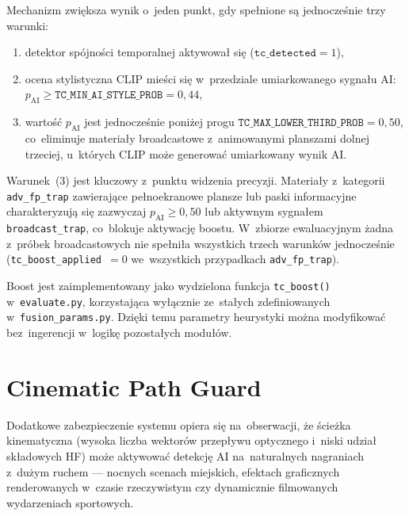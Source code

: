Mechanizm zwiększa wynik o~jeden punkt, gdy spełnione są jednocześnie
trzy warunki:
\begin{enumerate}
  \item detektor spójności temporalnej aktywował się ($\texttt{tc\_detected} = 1$),
  \item ocena stylistyczna CLIP mieści się w~przedziale umiarkowanego
    sygnału AI: $p_\text{AI} \geq \texttt{TC\_MIN\_AI\_STYLE\_PROB} = 0{,}44$,
  \item wartość $p_\text{AI}$ jest jednocześnie poniżej progu
    $\texttt{TC\_MAX\_LOWER\_THIRD\_PROB} = 0{,}50$,
    co~eliminuje materiały broadcastowe z~animowanymi planszami dolnej trzeciej,
    u~których CLIP może generować umiarkowany wynik AI.
\end{enumerate}

Warunek~(3) jest kluczowy z~punktu widzenia precyzji. Materiały z~kategorii
\texttt{adv\_fp\_trap} zawierające pełnoekranowe plansze lub paski informacyjne
charakteryzują się zazwyczaj $p_\text{AI} \geq 0{,}50$ lub aktywnym sygnałem
\texttt{broadcast\_trap}, co~blokuje aktywację boostu. W~zbiorze ewaluacyjnym
żadna z~próbek broadcastowych nie spełniła wszystkich trzech warunków
jednocześnie (\texttt{tc\_boost\_applied}~$= 0$ we~wszystkich przypadkach
\texttt{adv\_fp\_trap}).

Boost jest zaimplementowany jako wydzielona funkcja \texttt{tc\_boost()}
w~\texttt{evaluate.py}, korzystająca wyłącznie ze~stałych zdefiniowanych
w~\texttt{fusion\_params.py}. Dzięki temu parametry heurystyki można
modyfikować bez~ingerencji w~logikę pozostałych modułów.

\section{Cinematic Path Guard}
\label{sec:cinematic_guard}

Dodatkowe zabezpieczenie systemu opiera się na~obserwacji, że
ścieżka kinematyczna (wysoka liczba wektorów przepływu optycznego
i~niski udział składowych HF) może aktywować detekcję AI
na~naturalnych nagraniach z~dużym ruchem --- nocnych scenach miejskich,
efektach graficznych renderowanych w~czasie rzeczywistym czy dynamicznie
filmowanych wydarzeniach sportowych.

